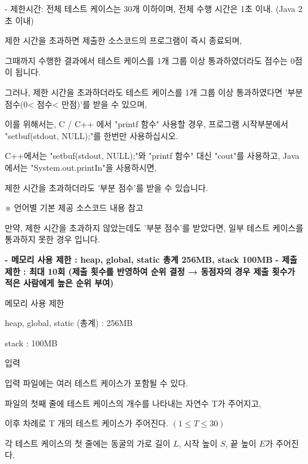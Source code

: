 \documentclass [12pt] {oblivoir}
\begin{document}
\vspace{3mm}

- 제한시간: 전체 테스트 케이스는 30개 이하이며, 전체 수행 시간은 1초 이내. (Java 2초 이내)

    제한 시간을 초과하면 제출한 소스코드의 프로그램이 즉시 종료되며,

    그때까지 수행한 결과에서 테스트 케이스를 1개 그룹 이상 통과하였더라도 점수는 0점이 됩니다.

    그러나, 제한 시간을 초과하더라도 테스트 케이스를 1개 그룹 이상 통과하였다면 '부분 점수(0< 점수< 만점)'를 받을 수 있으며,

    이를 위해서는, C / C++ 에서 "printf 함수" 사용할 경우, 프로그램 시작부분에서 "setbuf(stdout, NULL);"를 한번만 사용하십시오.

    C++에서는 "setbuf(stdout, NULL);"와 "printf 함수" 대신 "cout"를 사용하고, Java에서는 "System.out.printIn"을 사용하시면,

    제한 시간을 초과하더라도 '부분 점수'를 받을 수 있습니다.

    ※ 언어별 기본 제공 소스코드 내용 참고

    만약, 제한 시간을 초과하지 않았는데도 '부분 점수'를 받았다면, 일부 테스트 케이스를 통과하지 못한 경우 입니다.

\vspace{3mm}

\textbf{- 메모리 사용 제한 : heap, global, static 총계 256MB, stack 100MB}
\textbf{- 제출 제한 : 최대 10회 (제출 횟수를 반영하여 순위 결정 → 동점자의 경우 제출 횟수가 적은 사람에게 높은 순위 부여)}

\vspace{5mm}

메모리 사용 제한

\vspace{3mm}

heap, global, static (총계) : 256MB

stack : 100MB

\vspace{5mm}

입력

\vspace{3mm}

입력 파일에는 여러 테스트 케이스가 포함될 수 있다.

파일의 첫째 줄에 테스트 케이스의 개수를 나타내는 자연수 T가 주어지고,

이후 차례로 T 개의 테스트 케이스가 주어진다. $(1 \le T \le 30)$

각 테스트 케이스의 첫 줄에는 동굴의 가로 길이 $L$, 시작 높이 $S$, 끝 높이 $E$가 주어진다.
\end{document}
